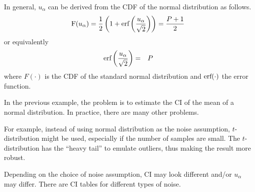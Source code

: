 In general, $u_{\alpha}$ can be derived from the CDF of the normal distribution as follows.
\begin{eqnarray}
	\textup{F}(u_\alpha) = \dfrac{1}{2}\left(1+\textup{erf}\left(\dfrac{u_\alpha}{\sqrt{2}}\right)\right) = \dfrac{P+1}{2} \nonumber
\end{eqnarray}
or equivalently
\begin{eqnarray}
	\textup{erf}\left(\dfrac{u_\alpha}{\sqrt{2}}\right) &=& P \nonumber
\end{eqnarray}
where $F(\cdot)$ is the CDF of the standard normal distribution and $\textup{erf}(\cdot)$ the error function.

In the previous example, the problem is to estimate the CI of the mean of a normal distribution. In practice, there are many other problems. 

For example, instead of using normal distribution as the noise assumption, $t$-distribution might be used, especially if the number of samples are small. The $t$-distribution has the ``heavy tail'' to emulate outliers, thus making the result more robust.

Depending on the choice of noise assumption, CI may look different and/or $u_{\alpha}$ may differ. There are CI tables for different types of noise.

